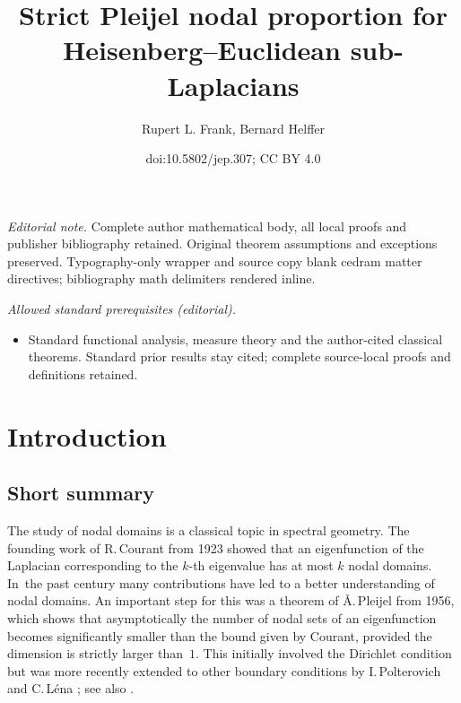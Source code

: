 \documentclass[10pt]{amsart}
\title{Strict Pleijel nodal proportion for Heisenberg–Euclidean sub-Laplacians}
\author{Rupert L. Frank, Bernard Helffer}
\date{doi:10.5802/jep.307; CC BY 4.0}
\theoremstyle{definition}
\newcommand{\1}{\mathbbm{1}}
\begin{document}
\maketitle
\noindent\textit{Editorial note.} Complete author mathematical body, all local proofs and publisher bibliography retained. Original theorem assumptions and exceptions preserved. Typography-only wrapper and source copy blank cedram matter directives; bibliography math delimiters rendered inline.\par\medskip
\noindent\textit{Allowed standard prerequisites (editorial).}\begin{itemize}
\item Standard functional analysis, measure theory and the author-cited classical theorems. Standard prior results stay cited; complete source-local proofs and definitions retained.
\end{itemize}\medskip
\vspace*{-\baselineskip}
\tableofcontents


\vspace*{-3\baselineskip}
\mbox{}
\section{Introduction}\label{s0}

\subsection{Short summary}
The study of nodal domains is a classical topic in spectral geometry. The founding work of R.\,Courant \cite{CH} from 1923 showed that an eigenfunction of the Laplacian corresponding to the $k$-th eigenvalue has at most $k$ nodal domains. In~the past century many contributions have led to a better understanding of nodal domains. An important step for this was a theorem of \AA.\,Pleijel \cite{Pl} from 1956, which shows that asymptotically the number of nodal sets of an eigenfunction becomes significantly smaller than the bound given by Courant, provided the dimension is strictly larger than~$1$. This initially involved the Dirichlet condition but was more recently extended to other boundary conditions by I.\,Polterovich \cite{Po} and C.\,Léna \cite{Le}; see also \cite{DFV}.
\end{document}
